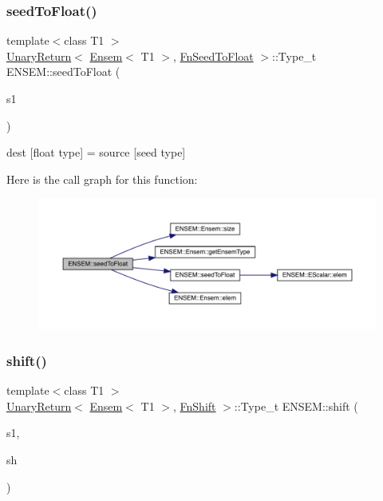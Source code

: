 \subsubsection{\texorpdfstring{seedToFloat()}{seedToFloat()}}
{\footnotesize\ttfamily template$<$class T1 $>$ \\
\mbox{\hyperlink{structENSEM_1_1UnaryReturn}{Unary\+Return}}$<$ \mbox{\hyperlink{classENSEM_1_1Ensem}{Ensem}}$<$ T1 $>$, \mbox{\hyperlink{structENSEM_1_1FnSeedToFloat}{Fn\+Seed\+To\+Float}} $>$\+::Type\+\_\+t E\+N\+S\+E\+M\+::seed\+To\+Float (\begin{DoxyParamCaption}\item[{const \mbox{\hyperlink{classENSEM_1_1Ensem}{Ensem}}$<$ T1 $>$ \&}]{s1 }\end{DoxyParamCaption})\hspace{0.3cm}{\ttfamily [inline]}}



dest \mbox{[}float type\mbox{]} = source \mbox{[}seed type\mbox{]} 

Here is the call graph for this function\+:\nopagebreak
\begin{figure}[H]
\begin{center}
\leavevmode
\includegraphics[width=350pt]{d1/d9e/group__eensem_ga92fac3bc9ad6164daf90b83052f0d48e_cgraph}
\end{center}
\end{figure}
\mbox{\label{group__eensem_gab3a27539680d018ea7af80f7fe677576}} 
\subsubsection{\texorpdfstring{shift()}{shift()}}
{\footnotesize\ttfamily template$<$class T1 $>$ \\
\mbox{\hyperlink{structENSEM_1_1UnaryReturn}{Unary\+Return}}$<$ \mbox{\hyperlink{classENSEM_1_1Ensem}{Ensem}}$<$ T1 $>$, \mbox{\hyperlink{structENSEM_1_1FnShift}{Fn\+Shift}} $>$\+::Type\+\_\+t E\+N\+S\+E\+M\+::shift (\begin{DoxyParamCaption}\item[{const \mbox{\hyperlink{classENSEM_1_1Ensem}{Ensem}}$<$ T1 $>$ \&}]{s1,  }\item[{int}]{sh }\end{DoxyParamCaption})\hspace{0.3cm}{\ttfamily [inline]}}

